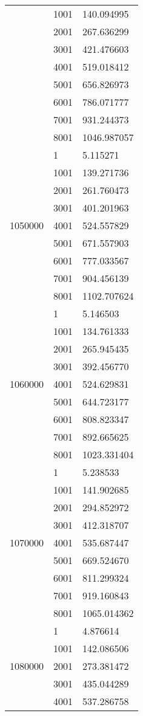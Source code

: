 \begin{table}[htb!]
\begin{tabular}{lll}
 & 1001 & 140.094995 \\
 & 2001 & 267.636299 \\
 & 3001 & 421.476603 \\
 & 4001 & 519.018412 \\
 & 5001 & 656.826973 \\
 & 6001 & 786.071777 \\
 & 7001 & 931.244373 \\
 & 8001 & 1046.987057 \\
\multirow[c]{9}{*}{1050000} & 1 & 5.115271 \\
 & 1001 & 139.271736 \\
 & 2001 & 261.760473 \\
 & 3001 & 401.201963 \\
 & 4001 & 524.557829 \\
 & 5001 & 671.557903 \\
 & 6001 & 777.033567 \\
 & 7001 & 904.456139 \\
 & 8001 & 1102.707624 \\
\multirow[c]{9}{*}{1060000} & 1 & 5.146503 \\
 & 1001 & 134.761333 \\
 & 2001 & 265.945435 \\
 & 3001 & 392.456770 \\
 & 4001 & 524.629831 \\
 & 5001 & 644.723177 \\
 & 6001 & 808.823347 \\
 & 7001 & 892.665625 \\
 & 8001 & 1023.331404 \\
\multirow[c]{9}{*}{1070000} & 1 & 5.238533 \\
 & 1001 & 141.902685 \\
 & 2001 & 294.852972 \\
 & 3001 & 412.318707 \\
 & 4001 & 535.687447 \\
 & 5001 & 669.524670 \\
 & 6001 & 811.299324 \\
 & 7001 & 919.160843 \\
 & 8001 & 1065.014362 \\
\multirow[c]{9}{*}{1080000} & 1 & 4.876614 \\
 & 1001 & 142.086506 \\
 & 2001 & 273.381472 \\
 & 3001 & 435.044289 \\
 & 4001 & 537.286758 \\

\end{tabular}
\end{table}
